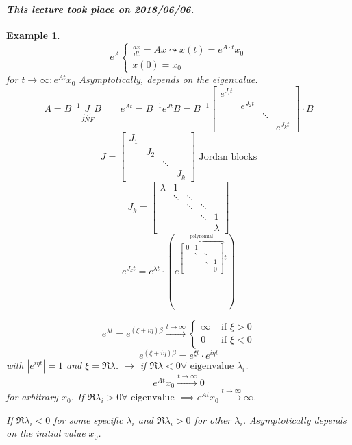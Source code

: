\documentclass{article}
\newtheorem{example}{Example}  \numberwithin{example}{section}
\newcommand{\card}[1]{\left|#1\right|}
\newcommand{\dateref}[1]{\paragraph{\textit{This lecture took place on #1.}}}
\begin{document}
\dateref{2018/06/06}

\begin{example} %
  \[ e^A \begin{cases} \frac{dx}{dt} = Ax \leadsto x(t) = e^{A \cdot t} x_0 \\ x(0) = x_0 \end{cases} \]
  for $t \to \infty: e^{At} x_0$
  Asymptotically, depends on the eigenvalue.
  \[ A = B^{-1} \underbrace{J}_{JNF} B \qquad e^{At} = B^{-1} e^{Jt} B = B^{-1} \begin{bmatrix} e^{J_it} & & & \\ & e^{J_2 t} & & \\ & & \ddots & \\ & & & e^{J_k t} \end{bmatrix} \cdot B \]
  \[ J = \begin{bmatrix} J_1 & & & \\ & J_2 & & \\ & & \ddots & \\ & & & J_k \end{bmatrix} \text{ Jordan blocks} \]
  \[ J_k = \begin{bmatrix} \lambda & 1 & & & \\ & \ddots & \ddots & & \\ & & \ddots & \ddots & \\ & & & \ddots & 1 \\ & & & & \lambda \end{bmatrix} \]
  \[ e^{J_k t} = e^{\lambda t} \cdot \left(e^{\overbrace{\begin{bmatrix} 0 & 1 & & \\ & \ddots & \ddots & \\ & & \ddots & 1 \\ & & & 0 \end{bmatrix}}^{\text{polynomial}} t}\right) \]

  \[ e^{\lambda t} = e^{(\xi + i \eta) \beta} \xrightarrow{t \to \infty} \begin{cases} \infty & \text{ if } \xi > 0 \\ 0 & \text{ if } \xi < 0 \end{cases} \]
  \[ e^{(\xi + i \eta) \beta} = e^{\xi t} \cdot e^{i \eta t} \]
  with $\card{e^{i \eta t}} = 1$ and $\xi = \Re{\lambda}$.
  $\to$ if $\Re{\lambda} < 0 \forall \text{ eigenvalue } \lambda_i$.
  \[ e^{At} x_0 \xrightarrow{t \to \infty} 0 \]
  for arbitrary $x_0$.
  If $\Re{\lambda_i} > 0 \forall \text{ eigenvalue}$ $\implies e^{At} x_0 \xrightarrow{t \to \infty} \infty$.

  If $\Re{\lambda_i} < 0$ for some specific $\lambda_i$ and $\Re{\lambda_i} > 0$ for other $\lambda_i$.
  Asymptotically depends on the initial value $x_0$.
\end{example}
\end{document}
